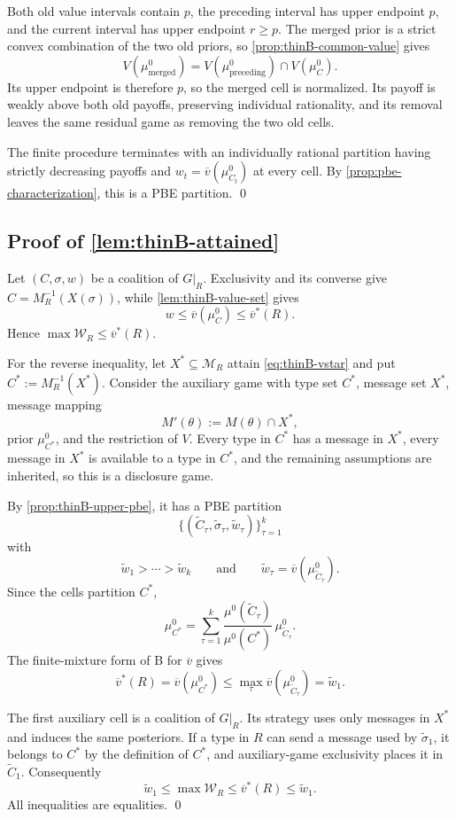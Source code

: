 \documentclass[11pt]{article}
\newcommand{\Msg}{\mathcal{M}}
\newcommand{\W}{\mathcal{W}}
\begin{document}
Both old value intervals contain $p$, the preceding interval has upper endpoint $p$, and the current interval has upper endpoint $r\geq p$. The merged prior is a strict convex combination of the two old priors, so \cref{prop:thinB-common-value} gives
\[
    V(\mu^0_{\mathrm{merged}})
    =
    V(\mu^0_{\mathrm{preceding}})
    \cap
    V(\mu^0_C).
\]
Its upper endpoint is therefore $p$, so the merged cell is normalized. Its payoff is weakly above both old payoffs, preserving individual rationality, and its removal leaves the same residual game as removing the two old cells.

The finite procedure terminates with an individually rational partition having strictly decreasing payoffs and $w_t=\overline v(\mu^0_{C_t})$ at every cell. By \cref{prop:pbe-characterization}, this is a PBE partition. \qed

\subsection*{Proof of \cref{lem:thinB-attained}}
Let $(C,\sigma,w)$ be a coalition of $G\vert_R$. Exclusivity and its converse give $C=M^{-1}_R(X(\sigma))$, while \cref{lem:thinB-value-set} gives
\[
    w\leq\overline v(\mu^0_C)\leq\overline v^*(R).
\]
Hence $\max\W_R\leq\overline v^*(R)$.

For the reverse inequality, let $X^*\subseteq\Msg_R$ attain \eqref{eq:thinB-vstar} and put $C^*:=M^{-1}_R(X^*)$. Consider the auxiliary game with type set $C^*$, message set $X^*$, message mapping
\[
    M'(\theta):=M(\theta)\cap X^*,
\]
prior $\mu^0_{C^*}$, and the restriction of $V$. Every type in $C^*$ has a message in $X^*$, every message in $X^*$ is available to a type in $C^*$, and the remaining assumptions are inherited, so this is a disclosure game.

By \cref{prop:thinB-upper-pbe}, it has a PBE partition
\[
    \{(\widetilde C_\tau,\widetilde\sigma_\tau,\widetilde w_\tau)\}_{\tau=1}^k
\]
with
\[
    \widetilde w_1>\cdots>\widetilde w_k
    \qquad\text{and}\qquad
    \widetilde w_\tau=\overline v(\mu^0_{\widetilde C_\tau}).
\]
Since the cells partition $C^*$,
\[
    \mu^0_{C^*}
    =
    \sum_{\tau=1}^k
    \frac{\mu^0(\widetilde C_\tau)}{\mu^0(C^*)}
    \,\mu^0_{\widetilde C_\tau}.
\]
The finite-mixture form of B for $\overline v$ gives
\[
    \overline v^*(R)
    =
    \overline v(\mu^0_{C^*})
    \leq
    \max_\tau\overline v(\mu^0_{\widetilde C_\tau})
    =
    \widetilde w_1.
\]

The first auxiliary cell is a coalition of $G\vert_R$. Its strategy uses only messages in $X^*$ and induces the same posteriors. If a type in $R$ can send a message used by $\widetilde\sigma_1$, it belongs to $C^*$ by the definition of $C^*$, and auxiliary-game exclusivity places it in $\widetilde C_1$. Consequently
\[
    \widetilde w_1
    \leq
    \max\W_R
    \leq
    \overline v^*(R)
    \leq
    \widetilde w_1.
\]
All inequalities are equalities. \qed
\end{document}
